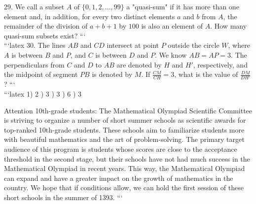 29. We call a subset $A$ of $\{0, 1, 2, \ldots, 99\}$ a "quasi-sum" if it has more than one element and, in addition, for every two distinct elements $a$ and $b$ from $A$, the remainder of the division of $a + b + 1$ by $100$ is also an element of $A$. How many quasi-sum subsets exist?
```
\\
```latex
30. The lines $AB$ and $CD$ intersect at point $P$ outside the circle $W$, where $A$ is between $B$ and $P$, and $C$ is between $D$ and $P$. We know $AB = AP = 3$. The perpendiculars from $C$ and $D$ to $AB$ are denoted by $H$ and $H'$, respectively, and the midpoint of segment $PB$ is denoted by $M$. If $\frac{CM}{CH} = 3$, what is the value of $\frac{DM}{DH'}$?
```
\\
```latex
1) 2  ) 3  ) 3 ) 6 ) 3

Attention 10th-grade students: The Mathematical Olympiad Scientific Committee is striving to organize a number of short summer schools as scientific awards for top-ranked 10th-grade students. These schools aim to familiarize students more with beautiful mathematics and the art of problem-solving. The primary target audience of this program is students whose scores are close to the acceptance threshold in the second stage, but their schools have not had much success in the Mathematical Olympiad in recent years. This way, the Mathematical Olympiad can expand and have a greater impact on the growth of mathematics in the country. We hope that if conditions allow, we can hold the first session of these short schools in the summer of 1393.
```
\\
